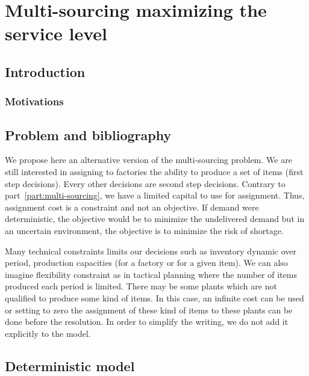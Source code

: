 \chapter{Multi-sourcing maximizing the service level}



\section{Introduction}


\subsection{Motivations}


\section{Problem and bibliography}


We propose here an alternative version of the multi-sourcing problem. We are still interested in assigning to factories the ability to produce a set of items (first step decisions). Every other decisions are second step decisions. Contrary to part~\ref{part:multi-sourcing}, we have a limited capital to use for assignment. Thus, assignment cost is a constraint and not an objective. If demand were deterministic, the objective would be to minimize the undelivered demand but in an uncertain environment, the objective is to minimize the risk of shortage.

Many technical constraints limits our decisions such as inventory dynamic over period, production capacities (for a factory or for a given item). We can also imagine flexibility constraint as in tactical planning where the number of items produced each period is limited. There may be some plants which are not qualified to produce some kind of items. In this case, an infinite cost can be used or setting to zero the assignment of these kind of items to these plants can be done before the resolution. In order to simplify the writing, we do not add it explicitly to the model.





\section{Deterministic model}


